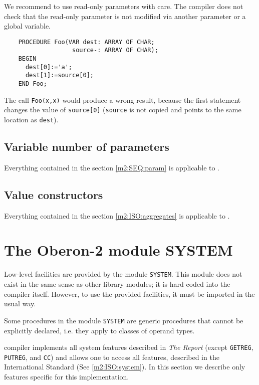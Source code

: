 We recommend to use read-only parameters with care. The compiler
does not check that the read-only parameter is not modified via
another parameter or a global variable.

\Example
\begin{verbatim}
    PROCEDURE Foo(VAR dest: ARRAY OF CHAR;
                   source-: ARRAY OF CHAR);
    BEGIN
      dest[0]:='a';
      dest[1]:=source[0];
    END Foo;
\end{verbatim}

The call \verb|Foo(x,x)| would produce a wrong result, because
the first statement changes the value of \verb|source[0]|
(\verb|source| is not copied and points to the same location
as \verb|dest|).

\subsection{Variable number of parameters}

\oextonly

Everything contained in the section \ref{m2:SEQ:param}
is applicable to \ot{}.

\subsection{Value constructors}

\oextonly

Everything contained in the section \ref{m2:ISO:aggregates}
is applicable to \ot{}.

\section{The Oberon-2 module SYSTEM}
\label{o2:system}

Low-level facilities are provided by the module \verb'SYSTEM'. This
module does not exist in the same sense as other library modules; it is
hard-coded into the compiler itself. However, to use the provided
facilities, it must be imported in the usual way.

Some procedures in the module \verb'SYSTEM' are generic procedures
that cannot be explicitly declared, i.e. they apply to classes of operand
types.

\xds{} \ot{} compiler implements all system features described in
{\em The \ot{} Report} (except \verb'GETREG', \verb'PUTREG', and \verb'CC') and       %
allows one to access all features, described in the \mt{} International
Standard \mt{} (See \ref{m2:ISO:system}). In this section we
describe only features specific for this implementation.

